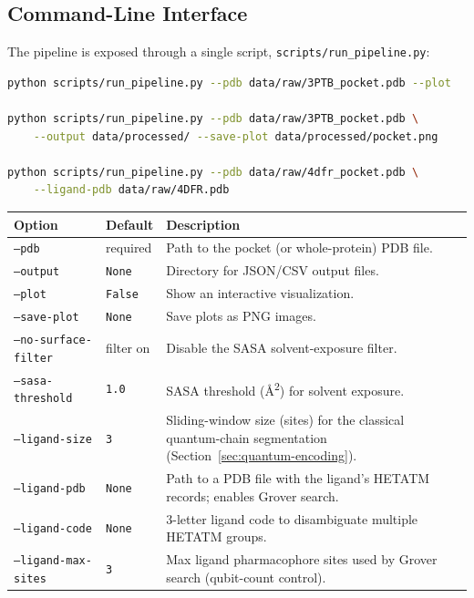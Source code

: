 \documentclass[11pt,a4paper]{article}
\begin{document}
\subsection{Command-Line Interface}

The pipeline is exposed through a single script, \texttt{scripts/run\_pipeline.py}:

\begin{lstlisting}[language=bash]
python scripts/run_pipeline.py --pdb data/raw/3PTB_pocket.pdb --plot

python scripts/run_pipeline.py --pdb data/raw/3PTB_pocket.pdb \
    --output data/processed/ --save-plot data/processed/pocket.png

python scripts/run_pipeline.py --pdb data/raw/4dfr_pocket.pdb \
    --ligand-pdb data/raw/4DFR.pdb
\end{lstlisting}

\begin{center}
\begin{tabular}{@{}p{3.2cm}p{2cm}p{8.5cm}@{}}
\toprule
\textbf{Option} & \textbf{Default} & \textbf{Description} \\
\midrule
\texttt{--pdb} & required & Path to the pocket (or whole-protein) PDB file. \\
\texttt{--output} & \texttt{None} & Directory for JSON/CSV output files. \\
\texttt{--plot} & \texttt{False} & Show an interactive visualization. \\
\texttt{--save-plot} & \texttt{None} & Save plots as PNG images. \\
\texttt{--no-surface-filter} & filter on & Disable the SASA solvent-exposure filter. \\
\texttt{--sasa-threshold} & \texttt{1.0} & SASA threshold (\r{A}\textsuperscript{2}) for solvent exposure. \\
\texttt{--ligand-size} & \texttt{3} & Sliding-window size (sites) for the classical quantum-chain segmentation (Section~\ref{sec:quantum-encoding}). \\
\texttt{--ligand-pdb} & \texttt{None} & Path to a PDB file with the ligand's HETATM records; enables Grover search. \\
\texttt{--ligand-code} & \texttt{None} & 3-letter ligand code to disambiguate multiple HETATM groups. \\
\texttt{--ligand-max-sites} & \texttt{3} & Max ligand pharmacophore sites used by Grover search (qubit-count control). \\
\bottomrule
\end{tabular}
\end{center}
\end{document}
